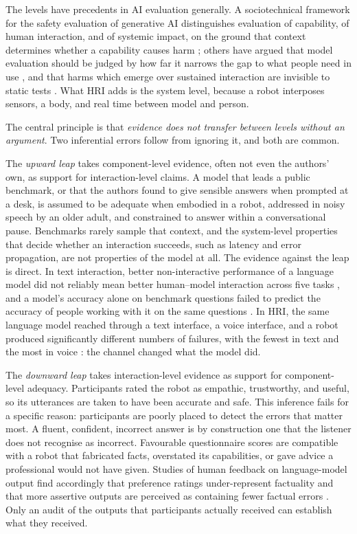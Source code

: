 The levels have precedents in AI evaluation generally. A sociotechnical
framework for the safety evaluation of generative AI distinguishes
evaluation of capability, of human interaction, and of systemic impact, on
the ground that context determines whether a capability causes harm
\cite{weidinger2023sociotechnical}; others have argued that model
evaluation should be judged by how far it narrows the gap to what people
need in use \cite{liao2023rethinking}, and that harms which emerge over
sustained interaction are invisible to static tests
\cite{ibrahim2025towards}. What HRI adds is the system level, because a
robot interposes sensors, a body, and real time between model and person.

The central principle is that \emph{evidence does not transfer between levels
without an argument}. Two inferential errors follow from ignoring it, and both
are common.

The \emph{upward leap} takes component-level evidence, often not even the
authors' own, as support for interaction-level claims. A model that leads a
public benchmark, or that the authors found to give sensible answers when
prompted at a desk, is assumed to be adequate when embodied in a robot,
addressed in noisy speech by an older adult, and constrained to answer within
a conversational pause. Benchmarks rarely sample that context, and the
system-level properties that decide whether an interaction succeeds, such as
latency and error propagation, are not properties of the model at all. The
evidence against the leap is direct. In text interaction, better
non-interactive performance of a language model did not reliably mean
better human--model interaction across five tasks
\cite{lee2023evaluating}, and a model's accuracy alone on benchmark
questions failed to predict the accuracy of people working with it on the
same questions \cite{chang2025chatbench}. In HRI, the same language model
reached through a text interface, a voice interface, and a robot produced
significantly different numbers of failures, with the fewest in text and
the most in voice \cite{kim2024understanding}: the channel changed what the
model did.

The \emph{downward leap} takes interaction-level evidence as support for
component-level adequacy. Participants rated the robot as empathic,
trustworthy, and useful, so its utterances are taken to have been accurate
and safe. This inference fails for a specific reason: participants are poorly
placed to detect the errors that matter most. A fluent, confident, incorrect
answer is by construction one that the listener does not recognise as
incorrect. Favourable questionnaire scores are compatible with a robot that
fabricated facts, overstated its capabilities, or gave advice a professional
would not have given. Studies of human feedback on language-model output
find accordingly that preference ratings under-represent factuality and that
more assertive outputs are perceived as containing fewer factual errors
\cite{hosking2024human}. Only an audit of the outputs that participants actually
received can establish what they received.

